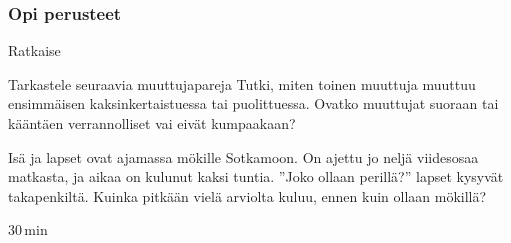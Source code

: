 \begin{tehtavasivu}

\subsubsection*{Opi perusteet}

\begin{tehtava}
Ratkaise
\begin{vastaus}
\end{vastaus}
\end{tehtava}

\begin{tehtava}
    Tarkastele seuraavia muuttujapareja
    Tutki, miten toinen muuttuja muuttuu ensimmäisen kaksinkertaistuessa tai puolittuessa. Ovatko muuttujat suoraan tai kääntäen verrannolliset vai eivät kumpaakaan?
    \begin{vastaus}
    \end{vastaus}
\end{tehtava}


\begin{tehtava}
Isä ja lapset ovat ajamassa mökille Sotkamoon. On ajettu jo neljä viidesosaa matkasta, ja aikaa on kulunut kaksi tuntia. ''Joko ollaan perillä?'' lapset kysyvät takapenkiltä. Kuinka pitkään vielä arviolta kuluu, ennen kuin ollaan mökillä?
    \begin{vastaus}
        $30$\,min
    \end{vastaus}
\end{tehtava}



\end{tehtavasivu}
